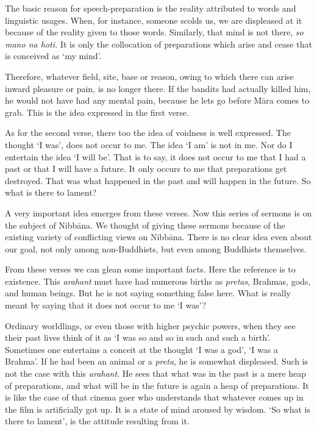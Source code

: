 The basic reason for speech-preparation is the reality attributed to words and linguistic usages. When, for instance, someone scolds us, we are displeased at it because of the reality given to those words. Similarly, that mind is not there, \emph{so mano na hoti.} It is only the collocation of preparations which arise and cease that is conceived as `my mind'.

Therefore, whatever field, site, base or reason, owing to which there can arise inward pleasure or pain, is no longer there. If the bandits had actually killed him, he would not have had any mental pain, because he lets go before Māra comes to grab. This is the idea expressed in the first verse.

As for the second verse, there too the idea of voidness is well expressed. The thought `I was', does not occur to me. The idea `I am' is not in me. Nor do I entertain the idea `I will be'. That is to say, it does not occur to me that I had a past or that I will have a future. It only occurs to me that preparations get destroyed. That was what happened in the past and will happen in the future. So what is there to lament?

A very important idea emerges from these verses. Now this series of sermons is on the subject of Nibbāna. We thought of giving these sermons because of the existing variety of conflicting views on Nibbāna. There is no clear idea even about our goal, not only among non-Buddhists, but even among Buddhists themselves.

From these verses we can glean some important facts. Here the reference is to existence. This \emph{arahant} must have had numerous births as \emph{pretas}, Brahmas, gods, and human beings. But he is not saying something false here. What is really meant by saying that it does not occur to me `I was'?

Ordinary worldlings, or even those with higher psychic powers, when they see their past lives think of it as `I was so and so in such and such a birth'. Sometimes one entertains a conceit at the thought `I was a god', `I was a Brahma'. If he had been an animal or a \emph{preta}, he is somewhat displeased. Such is not the case with this \emph{arahant}. He sees that what was in the past is a mere heap of preparations, and what will be in the future is again a heap of preparations. It is like the case of that cinema goer who understands that whatever comes up in the film is artificially got up. It is a state of mind aroused by wisdom. `So what is there to lament', is the attitude resulting from it.

